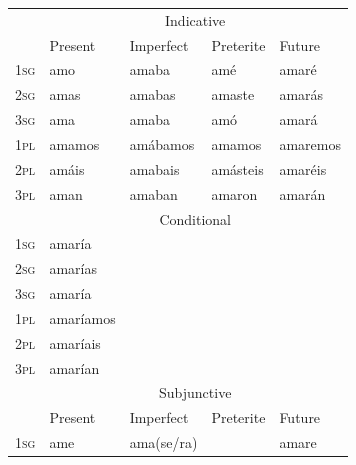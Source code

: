 \begin{table}
  \centering
  \begin{tabular}{lllll}
    \lsptoprule
        & \multicolumn{4}{c}{Indicative}                                                  \\
        & {Present}    & {Imperfect} & {Preterite} & {Future} \\
    \midrule
    \textsc{1sg} & amo                 & amaba              & amé                & amaré           \\
    \textsc{2sg} & amas                & amabas             & amaste             & amarás          \\
    \textsc{3sg} & ama                 & amaba              & amó                & amará           \\
    \textsc{1pl} & amamos              & amábamos           & amamos             & amaremos        \\
    \textsc{2pl} & amáis               & amabais            & amásteis           & amaréis         \\
    \textsc{3pl} & aman                & amaban             & amaron             & amarán          \\
    \midrule
        & \multicolumn{4}{c}{Conditional}                                                 \\
    \midrule
    \textsc{1sg} & amaría                                                                          \\
    \textsc{2sg} & amarías                                                                         \\
    \textsc{3sg} & amaría                                                                          \\
    \textsc{1pl} & amaríamos                                                                       \\
    \textsc{2pl} & amaríais                                                                        \\
    \textsc{3pl} & amarían                                                                         \\
    \midrule
        & \multicolumn{4}{c}{Subjunctive}                                                 \\
        & {Present}    & {Imperfect} & {Preterite} & {Future} \\
    \midrule
    \textsc{1sg} & ame                 & ama(se/ra)         &                    & amare           \\

\end{tabular}
\end{table}
